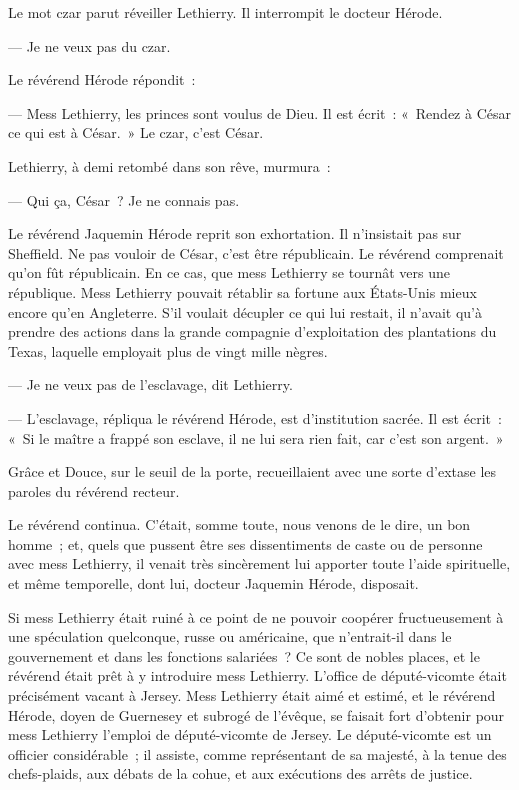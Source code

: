 \documentclass[french,twoside]{book} %
\begin{document}
Le mot czar parut réveiller Lethierry. Il interrompit le docteur Hérode.\par
— Je ne veux pas du czar.\par
Le révérend Hérode répondit :\par
— Mess Lethierry, les princes sont voulus de Dieu. Il est écrit : « Rendez à César ce qui est à César. » Le czar, c’est César.\par
Lethierry, à demi retombé dans son rêve, murmura :\par
— Qui ça, César ? Je ne connais pas.\par
Le révérend Jaquemin Hérode reprit son exhortation. Il n’insistait pas sur Sheffield. Ne pas vouloir de César, c’est être républicain. Le révérend comprenait qu’on fût républicain. En ce cas, que mess Lethierry se  tournât vers une république. Mess Lethierry pouvait rétablir sa fortune aux États-Unis mieux encore qu’en Angleterre. S’il voulait décupler ce qui lui restait, il n’avait qu’à prendre des actions dans la grande compagnie d’exploitation des plantations du Texas, laquelle employait plus de vingt mille nègres.\par
— Je ne veux pas de l’esclavage, dit Lethierry.\par
— L’esclavage, répliqua le révérend Hérode, est d’institution sacrée. Il est écrit : « Si le maître a frappé son esclave, il ne lui sera rien fait, car c’est son argent. »\par
Grâce et Douce, sur le seuil de la porte, recueillaient avec une sorte d’extase les paroles du révérend recteur.\par
Le révérend continua. C’était, somme toute, nous venons de le dire, un bon homme ; et, quels que pussent être ses dissentiments de caste ou de personne avec mess Lethierry, il venait très sincèrement lui apporter toute l’aide spirituelle, et même temporelle, dont lui, docteur Jaquemin Hérode, disposait.\par
Si mess Lethierry était ruiné à ce point de ne pouvoir coopérer fructueusement à une spéculation quelconque, russe ou américaine, que n’entrait-il dans le gouvernement et dans les fonctions salariées ? Ce sont de nobles places, et le révérend était prêt à y introduire mess Lethierry. L’office de député-vicomte était précisément vacant à Jersey. Mess Lethierry était aimé et estimé, et le révérend Hérode, doyen de Guernesey et subrogé de l’évêque, se faisait fort d’obtenir pour mess Lethierry l’emploi de député-vicomte de  Jersey. Le député-vicomte est un officier considérable ; il assiste, comme représentant de sa majesté, à la tenue des chefs-plaids, aux débats de la cohue, et aux exécutions des arrêts de justice.\par
\end{document}
